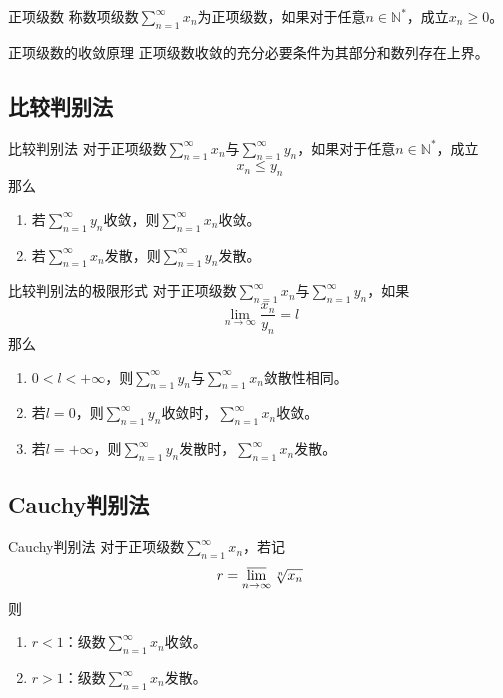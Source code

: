 \documentclass[lang = cn, scheme = chinese, thmcnt = section]{elegantbook}
\newcommand{\N}{\mathbb{N}}            %
\begin{document}
\begin{definition}{正项级数}
	称数项级数$\displaystyle \sum_{n=1}^{\infty}x_n$为正项级数，如果对于任意$n\in\N^*$，成立$x_n\ge 0$。
\end{definition}

\begin{theorem}{正项级数的收敛原理}
	正项级数收敛的充分必要条件为其部分和数列存在上界。
\end{theorem}

\subsection{比较判别法}

\begin{definition}{比较判别法}
	对于正项级数$\displaystyle \sum_{n=1}^{\infty}x_n$与$\displaystyle \sum_{n=1}^{\infty}y_n$，如果对于任意$n\in\N^*$，成立
	$$
	x_n\le y_n
	$$
	那么
	\begin{enumerate}
		\item 若$\displaystyle \sum_{n=1}^{\infty}y_n$收敛，则$\displaystyle \sum_{n=1}^{\infty}x_n$收敛。
		\item 若$\displaystyle \sum_{n=1}^{\infty}x_n$发散，则$\displaystyle \sum_{n=1}^{\infty}y_n$发散。
	\end{enumerate}
\end{definition}

\begin{definition}{比较判别法的极限形式}
	对于正项级数$\displaystyle \sum_{n=1}^{\infty}x_n$与$\displaystyle \sum_{n=1}^{\infty}y_n$，如果
	$$
	\lim_{n\to\infty}\frac{x_n}{y_n}=l
	$$
	那么
	\begin{enumerate}
		\item $0<l<+\infty$，则$\displaystyle \sum_{n=1}^{\infty}y_n$与$\displaystyle \sum_{n=1}^{\infty}x_n$敛散性相同。
		\item 若$l=0$，则$\displaystyle \sum_{n=1}^{\infty}y_n$收敛时，$\displaystyle \sum_{n=1}^{\infty}x_n$收敛。
		\item 若$l=+\infty$，则$\displaystyle \sum_{n=1}^{\infty}y_n$发散时，$\displaystyle \sum_{n=1}^{\infty}x_n$发散。
	\end{enumerate}
\end{definition}

\subsection{Cauchy判别法}

\begin{theorem}{Cauchy判别法}
	对于正项级数$\displaystyle \sum_{n=1}^{\infty}x_n$，若记
	$$
	r=\varlimsup_{n\to\infty} \sqrt[n]{x_n}
	$$
	则
	\begin{enumerate}
		\item $r<1$：级数$\displaystyle \sum_{n=1}^{\infty}x_n$收敛。
		\item $r>1$：级数$\displaystyle \sum_{n=1}^{\infty}x_n$发散。
	\end{enumerate}
\end{theorem}
\end{document}
